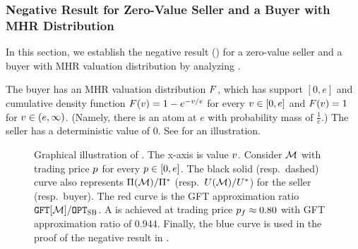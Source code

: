 \subsubsection{Negative Result for Zero-Value Seller and a Buyer with MHR Distribution}

In this section, we establish the negative result () for a zero-value seller and a buyer with MHR valuation distribution by analyzing . 

\begin{example}
\label{example:all fair:mhr buyer}
The buyer has an MHR valuation distribution $F$, which has support $[0, e]$ and cumulative density function $F(v) = 1 - e^{-v/e}$ for every $v\in[0, e]$ and $F(v) = 1$ for $v \in(e, \infty)$. (Namely, there is an atom at $e$ with probability mass of $\frac{1}{e}$.) The seller has a deterministic value of 0. See  for an illustration. 
\end{example}

\begin{figure}[ht]
    \centering
    
    \caption{Graphical illustration of . The x-axis is value $v$. 
    Consider {\FixPrice} $\mathcal{M}$ with trading price $p$ for every $p\in[0,e]$. The black solid (resp.\ dashed) curve also represents   ${\Pi(\mathcal{M})}/{\Pi^*}$ (resp.\ ${U(\mathcal{M})}/{U^*}$) for the seller (resp.\ buyer). The red curve is the GFT approximation ratio ${\GFT{\mech}}/{\OPTSB}$. 
    A {\ksfair} {\FixPrice} is achieved at trading price $p_f \approx 0.80$ with GFT approximation ratio of $0.944$. Finally, the blue curve is used in the proof of the negative result in .}
    \label{fig:all fair:mhr buyer}
\end{figure}


